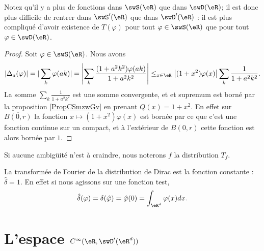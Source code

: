 Notez qu'il y a plus de fonctions dans \( \swS(\eR)\) que dans \( \swD(\eR)\); il est donc plus difficile de rentrer dans \( \swS'(\eR)\) que dans \( \swD'(\eR)\) : il est plus compliqué d'avoir existence de \( T(\varphi)\) pour tout \( \varphi\in\swS(\eR)\) que pour tout \( \varphi\in\swD(\eR)\).

\begin{proof}
    Soit \( \varphi\in\swS(\eR)\). Nous avons
    \begin{equation}
        |\Delta_a(\varphi)|=| \sum_k\varphi(ak) |=\left| \sum_k\frac{ (1+a^2k^2)\varphi(ak) }{ 1+a^2k^2 } \right| \leq_{x\in \eR}\big| (1+x^2)\varphi(x) \big|\sum_k\frac{1}{ 1+a^2k^2 }.
    \end{equation}
    La somme \( \sum_k\frac{1}{ 1+a^2k^2 }\) est une somme convergente, et et supremum est borné par la proposition \ref{PropCSmzwGv} en prenant \( Q(x)=1+x^2\). En effet sur \( \overline{ B(0,r) }\) la fonction \( x\mapsto (1+x^2)\varphi(x)\) est bornée par ce que c'est une fonction continue sur un compact, et à l'extérieur de \( B(0,r)\) cette fonction est alors bornée par \( 1\).
\end{proof}

Si aucune ambigüité n'est à craindre, nous noterons \( f\) la distribution \( T_f\).

\begin{example}
    La transformée de Fourier de la distribution de Dirac est la fonction constante : \( \hat \delta=1\). En effet si nous agissons sur une fonction test,
    \begin{equation}
        \hat \delta(\varphi)=\delta(\hat \varphi)=\hat \varphi(0)=\int_{\eR^d}\varphi(x)dx.
    \end{equation}
\end{example}

\section{L'espace \texorpdfstring{$  C^{\infty}(\eR,\swD'(\eR^d))$}{C(R,D')}}
\label{SecTEgDVWO}

